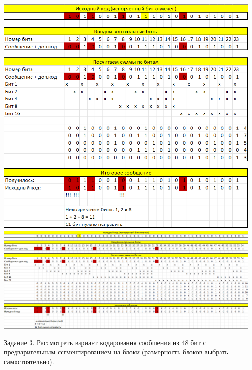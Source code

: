 \documentclass[a4paper,14pt]{extarticle}
\begin{document}
\begin{center}
\includegraphics[width=140mm]{f1_16}\\
\includegraphics[width=200mm]{f1_48}
\end{center}
Задание 3. Рассмотреть вариант кодирования сообщения из 48 бит с предварительным
сегментированием на блоки (размерность блоков выбрать самостоятельно).
\end{document}
